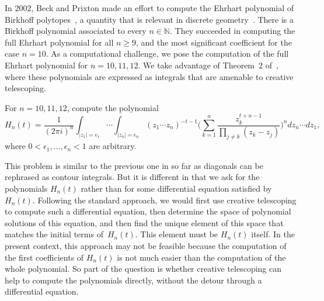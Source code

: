 \documentclass{jssc}
\let\set\mathbb
\begin{document}
 In 2002, Beck and Prixton made an effort to compute the Ehrhart polynomial of Birkhoff polytopes~\cite{beck03}, a
 quantity that is relevant in discrete geometry~\cite{beck07}. There is a Birkhoff polynomial associated to every
 $n\in\set N$. They succeeded in computing the full Ehrhart polynomial for all $n\geq9$, and the most significant
 coefficient for the case $n=10$. As a computational challenge, we pose the computation of the
 full Ehrhart polynomial for $n=10,11,12$. We take advantage of Theorem~2 of~\cite{beck03}, where these polynomials
 are expressed as integrals that are amenable to creative telescoping.
 \begin{problem}
   For $n=10,11,12$, compute the polynomial
   \[
   H_n(t)=\frac1{(2\pi i)^n}\int_{|z_1|=\epsilon_1}\cdots\int_{|z_n|=\epsilon_n} (z_1\cdots z_n)^{-t-1}
      \biggl(\sum_{k=1}^n\frac{z_k^{t+n-1}}{\prod_{j\neq k}(z_k-z_j)}\biggr)^n dz_n\cdots dz_1,
   \]
   where $0<\epsilon_1,\dots,\epsilon_n<1$ are arbitrary.
 \end{problem}
 This problem is similar to the previous one in so far as diagonals can be rephrased as contour integrals. But it
 is different in that we ask for the polynomials $H_n(t)$ rather than for some differential equation
 satisfied by~$H_n(t)$. Following the standard approach, we would first use creative telescoping to compute such
 a differential equation, then determine the space of polynomial solutions of this equation, and then find
 the unique element of this space that matches the initial terms of~$H_n(t)$. This element must be $H_n(t)$ itself.
 In the present context, this approach may not be feasible because the computation of the first coefficients of $H_n(t)$
 is not much easier than the computation of the whole polynomial. So part of the question is whether creative telescoping
 can help to compute the polynomials directly, without the detour through a differential equation.



\end{document}
